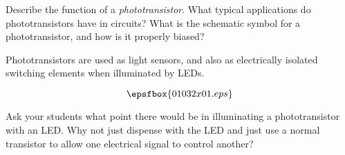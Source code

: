 

Describe the function of a {\it phototransistor}.  What typical applications do phototransistors have in circuits?  What is the schematic symbol for a phototransistor, and how is it properly biased?







Phototransistors are used as light sensors, and also as electrically isolated switching elements when illuminated by LEDs.

$$\epsfbox{01032x01.eps}$$







Ask your students what point there would be in illuminating a phototransistor with an LED.  Why not just dispense with the LED and just use a normal transistor to allow one electrical signal to control another?




